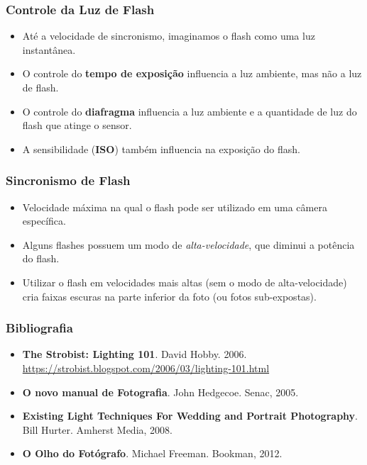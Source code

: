 
\begin{frame}
  \frametitle{Controle da Luz de Flash}
  \begin{itemize}
      \item Até a velocidade de sincronismo, imaginamos o flash como uma luz instantânea.
      \item O controle do \textbf{tempo de exposição} influencia a luz ambiente, mas não
      a luz de flash.
      \item O controle do \textbf{diafragma} influencia a luz ambiente e a quantidade de
      luz do flash que atinge o sensor.
      \item A sensibilidade (\textbf{ISO}) também influencia na exposição do flash.
  \end{itemize}
\end{frame}

\begin{frame}
  \frametitle{Sincronismo de Flash}
  \begin{itemize}
      \item Velocidade máxima na qual o flash pode ser utilizado em uma câmera
      específica.
      \item Alguns flashes possuem um modo de \textit{alta-velocidade}, que diminui
      a potência do flash.
      \item Utilizar o flash em velocidades mais altas (sem o modo de alta-velocidade)
      cria faixas escuras na parte inferior da foto (ou fotos sub-expostas).
  \end{itemize}
\end{frame}



\begin{frame}
    \frametitle{Bibliografia}
    \begin{itemize}
        \item \textbf{The Strobist: Lighting 101}. David Hobby. 2006.
        \hspace{2cm} \url{https://strobist.blogspot.com/2006/03/lighting-101.html}
        \item \textbf{O novo manual de Fotografia}. John Hedgecoe. Senac, 2005.
        \item \textbf{Existing Light Techniques For Wedding and Portrait Photography}.
        Bill Hurter. Amherst Media, 2008.
        \item \textbf{O Olho do Fotógrafo}. Michael Freeman. Bookman, 2012.
    \end{itemize}
\end{frame}


